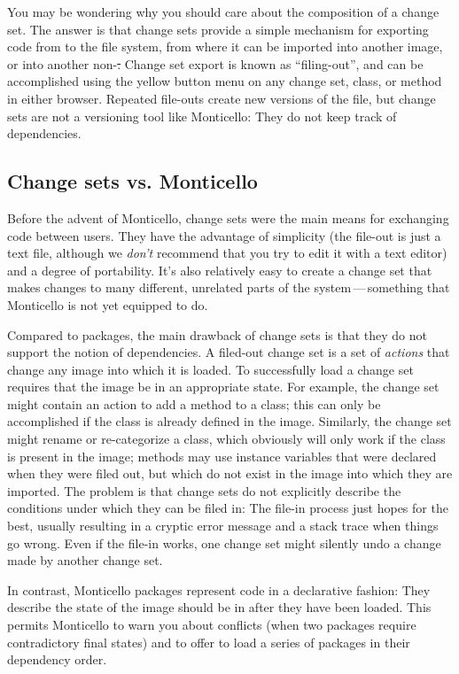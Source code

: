 \documentclass[a4paper,10pt,twoside]{book}
\begin{document}
You may be wondering why you should care about the composition of a change set.
The answer is that change sets provide a simple mechanism for exporting code from \sq to the file system, from where it can be imported into another \sq image, or into another non-\sq \st.
Change set export is known as ``filing-out'', and can be accomplished using the yellow button menu on any change set, class, or method in either browser.
Repeated file-outs create new versions of the file, but change sets are not a versioning tool like Monticello:
They do not keep track of dependencies.

\subsection{Change sets vs. Monticello}

Before the advent of Monticello, change sets were the main means for exchanging code between \sq{} users.
They have the advantage of simplicity (the file-out is just a text file, although we \emph{don't} recommend that you try to edit it with a text editor) and a degree of portability.
It's also relatively easy to create a change set that makes changes to many different, unrelated parts of the system\,---\,something that Monticello is not yet equipped to do.

Compared to  packages, the main drawback of change sets is that they do not support the notion of dependencies.
A filed-out change set is a set of \emph{actions} that change any image into which it is loaded.
To successfully load a change set requires that the image be in an appropriate state.
For example, the change set might contain an action to add a method to a class; this can only be accomplished if the class is already defined in the image.
Similarly, the change set might rename or re-categorize a class, which obviously will only work if the class is present in the image; methods may use instance variables that were declared when they were filed out, but which do not exist in the image into which they are imported.
The problem is that change sets do not explicitly describe the conditions under which they can be filed in:
The file-in process just hopes for the best, usually resulting in a cryptic error message and a stack trace when things go wrong.
Even if the file-in works, one change set might silently undo a change made by another change set.

In contrast, Monticello packages represent code in a declarative fashion:
They describe the state of the image should be in after they have been loaded.
This permits Monticello to warn you about conflicts (when two packages require contradictory final states) and to offer to load a series of packages in their dependency order.
\end{document}
